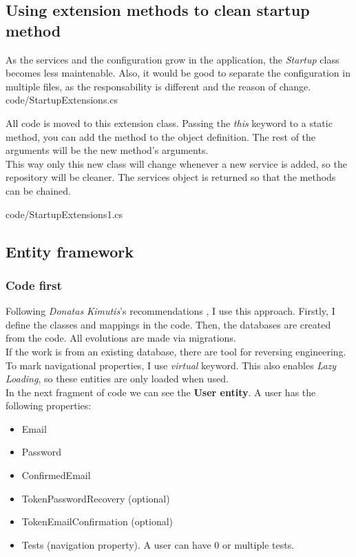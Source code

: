     \subsection{Using extension methods to clean startup method}
    As the services and the configuration grow in the application, the \textit{Startup} class becomes less maintenable. Also, it would be good to separate the configuration in multiple files, as the responsability is different and the reason of change. \\
    
    
    {code/StartupExtensions.cs}

    All code is moved to this extension class. Passing the \textit{this} keyword to a static method, you can add the method to the object definition. The rest of the arguments will be the new method's arguments. \\
    This way only this new class will change whenever a new service is added, so the repository will be cleaner. The services object is returned so that the methods can be chained.
    
    {code/StartupExtensions1.cs}

    \subsection{Entity framework}
        \subsubsection{Code first}
        Following \textit{Donatas Kimutis}'s recommendations \cite{Kimutis}, I use this approach. Firstly, I define the classes and mappings in the code. Then, the databases are created from the code. All evolutions are made via migrations. \\
        If the work is from an existing database, there are tool for reversing engineering. \\

        To mark navigational properties, I use \textit{virtual} keyword. This also enables \textit{Lazy Loading}, so these entities are only loaded when used. \\

        In the next fragment of code we can see the \textbf{User entity}. A user has the following properties:
        \begin{itemize}
            \item Email
            \item Password
            \item ConfirmedEmail
            \item TokenPasswordRecovery (optional)
            \item TokenEmailConfirmation (optional)
            \item Tests (navigation property). A user can have 0 or multiple tests.
        \end{itemize}

